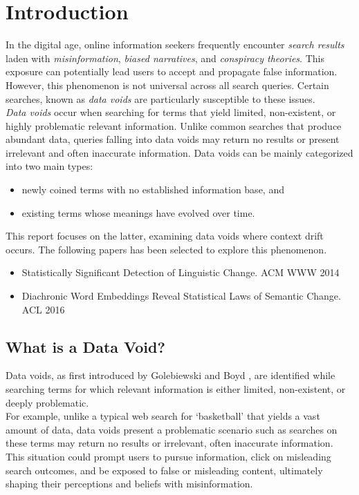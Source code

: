 
\section{Introduction} \label{sec:introduction}
In the digital age, online information seekers frequently encounter \emph{search results} laden with \emph{misinformation}, \emph{biased narratives}, and \emph{conspiracy theories}.
This exposure can potentially lead users to accept and propagate false information.
However, this phenomenon is not universal across all search queries.
Certain searches, known as \textit{data voids} are particularly susceptible to these issues.
\\
\textit{Data voids} occur when searching for terms that yield limited, non-existent, or highly problematic relevant information.
Unlike common searches that produce abundant data, queries falling into data voids may return no results or present irrelevant and often inaccurate information.
Data voids can be mainly categorized into two main types:
\begin{itemize}
    \item newly coined terms with no established information base, and
    \item existing terms whose meanings have evolved over time.
\end{itemize}
This report focuses on the latter, examining data voids where context drift occurs.
The following papers has been selected to explore this phenomenon.
\begin{itemize}
    \item Statistically Significant Detection of Linguistic Change.
    ACM WWW 2014 ~\cite{kulkarni2014statisticallysignificantdetectionlinguistic}
    \item Diachronic Word Embeddings Reveal Statistical Laws of Semantic Change.
    ACL 2016 ~\cite{hamilton-etal-2016-diachronic}
\end{itemize}

\subsection{What is a Data Void?}\label{subsec:what-is-a-data-void?}
Data voids, as first introduced by Golebiewski and Boyd \cite{unknown},
are identified while searching terms for which relevant information is either limited, non-existent, or deeply problematic.
\\
For example, unlike a typical web search for `basketball' that yields a vast amount of data,
data voids present a problematic scenario such as searches on these terms may return no results or irrelevant, often inaccurate information.
This situation could prompt users to pursue information, click on misleading search outcomes, and be exposed to false or misleading content,
ultimately shaping their perceptions and beliefs with misinformation.

